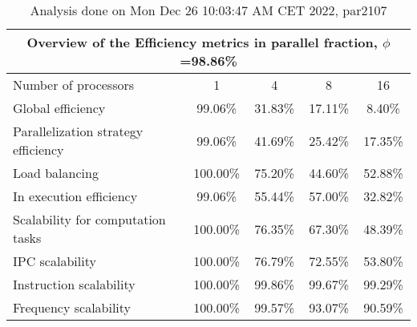 \begin{table}[h]
\begin{center}
\begin{tabular}{|l|c|c|c|c|}
\hline
\multicolumn{5}{|c|}{Overview of the Efficiency metrics in parallel fraction, $\phi$=98.86\%} \\
\hline
\hline
Number of processors & 1 & 4 & 8 & 16 \\
\hline
\hline
Global efficiency                      &     99.06\% &     31.83\% &     17.11\% &      8.40\% \\
\hline
\hline
Parallelization strategy efficiency &     99.06\% &     41.69\% &     25.42\% &     17.35\% \\
\hline
Load balancing                   &    100.00\% &     75.20\% &     44.60\% &     52.88\% \\
In execution efficiency          &     99.06\% &     55.44\% &     57.00\% &     32.82\% \\
\hline
\hline
Scalability for computation tasks   &    100.00\% &     76.35\% &     67.30\% &     48.39\% \\
\hline
IPC scalability                  &    100.00\% &     76.79\% &     72.55\% &     53.80\% \\
Instruction scalability          &    100.00\% &     99.86\% &     99.67\% &     99.29\% \\
Frequency scalability            &    100.00\% &     99.57\% &     93.07\% &     90.59\% \\
\hline
\end{tabular}
\end{center}
\caption{ Analysis done on Mon Dec 26 10:03:47 AM CET 2022, par2107}
\end{table}
